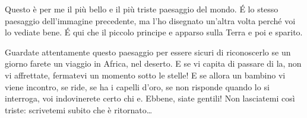 \documentclass[11pt]{scrbook}
\begin{document}
Questo è per me il più bello e il più triste paesaggio del mondo. É lo
stesso paesaggio dell'immagine precedente, ma l'ho disegnato un'altra
volta perché voi lo vediate bene. É qui che il piccolo principe e
apparso sulla Terra e poi e sparito.

Guardate attentamente questo paesaggio per essere sicuri di riconoscerlo
se un giorno farete un viaggio in Africa, nel deserto. E se vi capita di
passare di la, non vi affrettate, fermatevi un momento sotto le stelle!
E se allora un bambino vi viene incontro, se ride, se ha i capelli
d'oro, se non risponde quando lo si interroga, voi indovinerete certo
chi e. Ebbene, siate gentili! Non lasciatemi così triste: scrivetemi
subito che è ritornato\ldots{}
\end{document}
